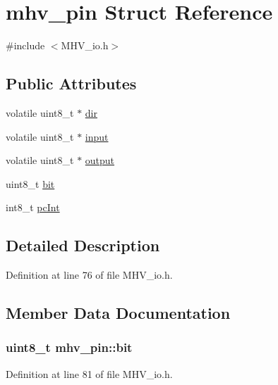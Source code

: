 \hypertarget{structmhv__pin}{
\section{mhv\-\_\-pin \-Struct \-Reference}
\label{structmhv__pin}
}


{\ttfamily \#include $<$\-M\-H\-V\-\_\-io.\-h$>$}

\subsection*{\-Public \-Attributes}
\begin{DoxyCompactItemize}
\item 
volatile uint8\-\_\-t $\ast$ \hyperlink{structmhv__pin_af92bee18d70be924e19ce2d2a6a7b14c}{dir}
\item 
volatile uint8\-\_\-t $\ast$ \hyperlink{structmhv__pin_a7c545d8bf340b11c799df9bc2c998076}{input}
\item 
volatile uint8\-\_\-t $\ast$ \hyperlink{structmhv__pin_a5c5f34f91b6586d0603e9568900f8423}{output}
\item 
uint8\-\_\-t \hyperlink{structmhv__pin_a6e630b4b7c21827dd791ba0fd68f5c57}{bit}
\item 
int8\-\_\-t \hyperlink{structmhv__pin_a10252efa71e71a7e0e5ddb1d184c7101}{pc\-Int}
\end{DoxyCompactItemize}


\subsection{\-Detailed \-Description}


\-Definition at line 76 of file \-M\-H\-V\-\_\-io.\-h.



\subsection{\-Member \-Data \-Documentation}
\hypertarget{structmhv__pin_a6e630b4b7c21827dd791ba0fd68f5c57}{
\subsubsection[{bit}]{\setlength{\rightskip}{0pt plus 5cm}uint8\-\_\-t {\bf mhv\-\_\-pin\-::bit}}}
\label{structmhv__pin_a6e630b4b7c21827dd791ba0fd68f5c57}


\-Definition at line 81 of file \-M\-H\-V\-\_\-io.\-h.

